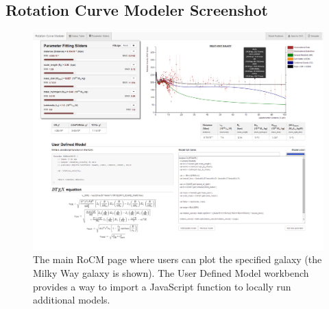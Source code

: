 \documentclass[conference]{IEEEtran-modified}
\begin{document}
\begin{appendices}

\section{Rotation Curve Modeler Screenshot} \label{screenshot}

\begin{figure}[h!]
\centering
\includegraphics[width=\textwidth, frame, trim = -1cm -1cm -1cm -1cm, clip]{rocm_screenshot_full}
\caption{The main RoCM page where users can plot the specified galaxy (the Milky Way galaxy is shown). The User Defined Model workbench provides a way to import a JavaScript function to locally run additional models.}
\label{rocm_fig}
\end{figure}


\end{appendices}
\end{document}
